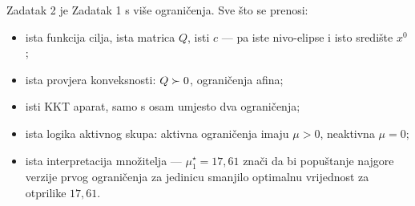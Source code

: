 \begin{predznanje}
Zadatak 2 je Zadatak 1 s više ograničenja. Sve što se prenosi:
\begin{itemize}[nosep,leftmargin=*]
  \item ista funkcija cilja, ista matrica $Q$, isti $c$ --- pa iste nivo-elipse i
        isto središte $x^{0}$;
  \item ista provjera konveksnosti: $Q \succ 0$, ograničenja afina;
  \item isti KKT aparat, samo s osam umjesto dva ograničenja;
  \item ista logika aktivnog skupa: aktivna ograničenja imaju $\mu > 0$,
        neaktivna $\mu = 0$;
  \item ista interpretacija množitelja --- $\mu_1^{\star} = 17{,}61$ znači da bi
        popuštanje najgore verzije prvog ograničenja za jedinicu smanjilo
        optimalnu vrijednost za otprilike $17{,}61$.
\end{itemize}
\end{predznanje}
